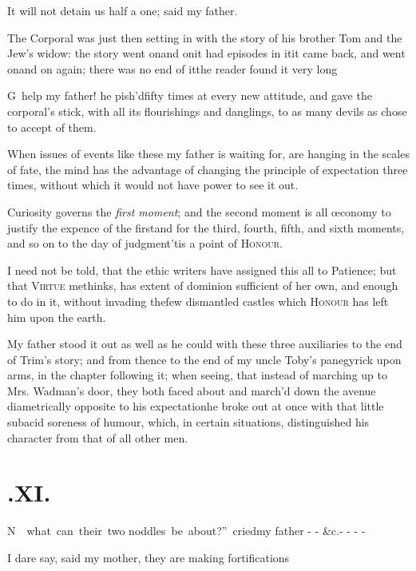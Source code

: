 \documentclass{article}
\begin{document}
\tsh It will not detain us half a one; said my
father.

The Corporal was just then setting in with the story of his brother Tom and the
Jew’s widow: the story went on\tsk\break and on\tsh it had episodes in it\tsh\break it came
back, and went on\tsh and on again; there was no end of it\tsh the reader found it
very long\tsh

\tsh G\tsk\, help my father! he pish’d\break fifty
times at every new attitude, and gave the corporal’s stick,
with all its flourishings and danglings, to as many devils as chose
to accept of them.

\newpage
When issues of events like these my father is waiting for, are
hanging in the scales of fate, the mind has the advantage of
changing the principle of expectation three times, without which it
would not have power to see it out.

Curiosity governs the \textit{first moment}; and the second moment is all œconomy to
justify the expence of the first\tsh\break and for the third, fourth, fifth, and
sixth moments, and so on to the day of judgment\tsk ’tis a point of \textsc{Honour}.

I need not be told, that the ethic writers have assigned this all to Patience; but
that \textsc{Virtue} methinks, has extent of dominion sufficient of her own, and
enough to do in it, without invading the\pb few dismantled castles which
\textsc{Honour} has left him upon the earth.

My father stood it out as well as he could with these three auxiliaries to the end
of Trim’s story; and from thence to the end of my uncle Toby’s panegyrick upon arms,
in the chapter following it; when seeing, that instead of marching up to Mrs.\@
Wadman’s door, they both faced about and march’d down the ave\-nue diametrically
opposite to his expectation\tsk he broke out at once with that little subacid soreness
of humour, which, in certain situations, distinguished his character from that of
all other men.

\newpage
\section{.\enspace XI.}

\lettrine{N}{\,}\nobreak
\hbox{\kern 5pt what can their two}\break
\hbox{noddles be about?” cried}\break my father - - \&c.\@ - - - -

I dare say, said my mother, they are making
fortifications\tsh
\end{document}

